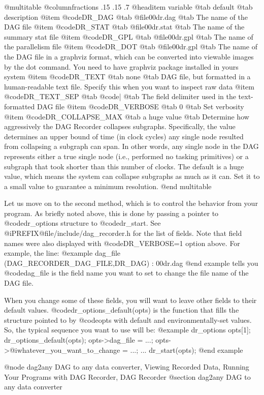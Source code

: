 @multitable @columnfractions .15 .15 .7
@headitem variable @tab default @tab description
@item @code{DR_DAG}  @tab @file{00dr.dag}  @tab The name of the DAG file 
@item @code{DR_STAT} @tab @file{00dr.stat} @tab The name of the summary stat file 
@item @code{DR_GPL}  @tab @file{00dr.gpl}  @tab The name of the parallelism file 
@item @code{DR_DOT}  @tab @file{00dr.gpl}  @tab The name of the DAG file in a graphviz format, which can be converted into viewable images by the dot command.  You need to have graphviz package installed in yours system 
@item @code{DR_TEXT} @tab none      @tab DAG file, but formatted in a human-readable text file.
Specify this when you want to inspect raw data 
@item @code{DR_TEXT_SEP} @tab @code{|} @tab The field delimiter used in the text-formatted DAG file 
@item @code{DR_VERBOSE}  @tab 0  @tab Set verbosity 
@item @code{DR_COLLAPSE_MAX} @tab a huge value @tab Determine how aggressively the DAG Recorder collapses subgraphs.  Specifically, the value determines an upper bound of time (in clock cycles) any single node resulted from collapsing a subgraph can span.  In other words, any single node in the DAG represents either a true single node (i.e., performed no tasking primitives) or a subgraph that took shorter than this number of clocks.  The default is a huge value, which means the system can collapse subgraphs as much as it can.  Set it to a small value to guarantee a minimum resolution.
@end multitable

Let us move on to the second method, which is to control the behavior
from your program.  As briefly noted above, this is done by passing a
pointer to @code{dr_options} structure to @code{dr_start}.  See
@i{PREFIX}@file{/include/dag_recorder.h} for the list of fields.  Note
that field names were also displayed with @code{DR_VERBOSE=1} option
above.  For example, the line:
@example
dag_file (DAG_RECORDER_DAG_FILE,DR_DAG) : 00dr.dag
@end example
tells you @code{dag_file} is the field name you want to set to change
the file name of the DAG file.

When you change some of these fields, you will want to leave other
fields to their default values.  @code{dr_options_default(opts)}
is the function that fills the structure pointed to by @code{opts}
with default and environmentally-set values.  So, the typical sequence you want to use will be:
@example
dr_options opts[1];
dr_options_default(opts);
opts->dag_file = ...;
opts->@i{whatever_you_want_to_change} = ...;
   ...
dr_start(opts);
@end example

@node dag2any DAG to any data converter, Viewing Recorded Data, Running Your Programs with DAG Recorder, DAG Recorder
@section dag2any DAG to any data converter

